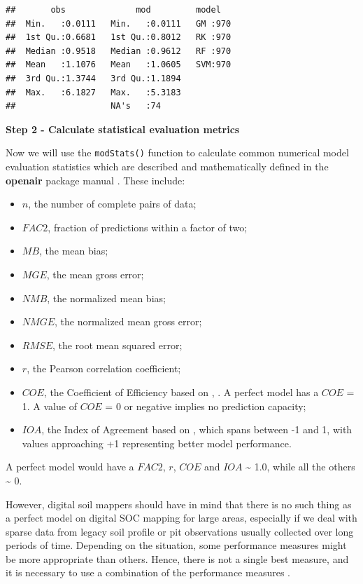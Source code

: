 \documentclass[10pt,b5paper,]{book}
\providecommand{\tightlist}{%
  \setlength{\itemsep}{0pt}\setlength{\parskip}{0pt}}
\theoremstyle{definition}
\theoremstyle{definition}
\theoremstyle{definition}
\theoremstyle{remark}
\begin{document}
\begin{verbatim}
##       obs              mod         model    
##  Min.   :0.0111   Min.   :0.0111   GM :970  
##  1st Qu.:0.6681   1st Qu.:0.8012   RK :970  
##  Median :0.9518   Median :0.9612   RF :970  
##  Mean   :1.1076   Mean   :1.0605   SVM:970  
##  3rd Qu.:1.3744   3rd Qu.:1.1894            
##  Max.   :6.1827   Max.   :5.3183            
##                   NA's   :74
\end{verbatim}

\textbf{Step 2 - Calculate statistical evaluation metrics}

Now we will use the \texttt{modStats()} function to calculate common
numerical model evaluation statistics which are described and
mathematically defined in the \textbf{openair} package manual \citep[Ch.
27, pp.~231-233]{carslaw2015openair}. These include:

\begin{itemize}
\tightlist
\item
  \(n\), the number of complete pairs of data;
\item
  \(FAC2\), fraction of predictions within a factor of two;
\item
  \(MB\), the mean bias;
\item
  \(MGE\), the mean gross error;
\item
  \(NMB\), the normalized mean bias;
\item
  \(NMGE\), the normalized mean gross error;
\item
  \(RMSE\), the root mean squared error;
\item
  \(r\), the Pearson correlation coefficient;
\item
  \(COE\), the Coefficient of Efficiency based on
  \citet{legates1999evaluating}, \citet{legates2013refined}. A perfect
  model has a \(COE\) = 1. A value of \(COE\) = 0 or negative implies no
  prediction capacity;
\item
  \(IOA\), the Index of Agreement based on \citet{willmott2012refined},
  which spans between -1 and 1, with values approaching +1 representing
  better model performance.
\end{itemize}

A perfect model would have a \(FAC2\), \(r\), \(COE\) and \(IOA\)
\textasciitilde{} 1.0, while all the others \textasciitilde{} 0.

However, digital soil mappers should have in mind that there is no such
thing as a perfect model on digital SOC mapping for large areas,
especially if we deal with sparse data from legacy soil profile or pit
observations usually collected over long periods of time. Depending on
the situation, some performance measures might be more appropriate than
others. Hence, there is not a single best measure, and it is necessary
to use a combination of the performance measures \citep{chang2004air}.
\end{document}
